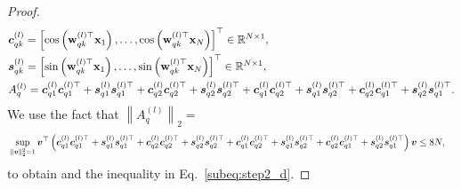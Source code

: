 \begin{proof}
\begin{equation}
    \begin{aligned}
        & \boldsymbol{c}_{qk}^{(l)}  =\left[\cos \left( {\mathbf w}_{qk}^{(l)\top} {\mathbf x}_1\right), \ldots, \cos \left({\mathbf w}_{qk}^{(l)\top} {\mathbf x}_N\right)\right]^\top \in \mathbb{R}^{N \times 1}, \\
        & \boldsymbol{s}_{qk}^{(l)}  =\left[\sin \left( {\mathbf w}_{qk}^{(l)\top} {\mathbf x}_1\right) , \ldots, \sin \left({\mathbf w}_{qk}^{(l)\top} {\mathbf x}_N\right)\right]^\top \in \mathbb{R}^{N \times 1},\\
        & A_{q}^{(l)} = \boldsymbol{c}_{q1}^{(l)}\boldsymbol{c}_{q1}^{(l)\top}
        +\boldsymbol{s}_{q1}^{(l)}\boldsymbol{s}_{q1}^{(l)\top} + \boldsymbol{c}_{q2}^{(l)}\boldsymbol{c}_{q2}^{(l)\top}
        +\boldsymbol{s}_{q2}^{(l)}\boldsymbol{s}_{q2}^{(l)\top} +\boldsymbol{c}_{q1}^{(l)}\boldsymbol{c}_{q2}^{(l)\top}
        +\boldsymbol{s}_{q1}^{(l)}\boldsymbol{s}_{q2}^{(l)\top} +\boldsymbol{c}_{q2}^{(l)}\boldsymbol{c}_{q1}^{(l)\top}
        +\boldsymbol{s}_{q2}^{(l)}\boldsymbol{s}_{q1}^{(l)\top}.   
    \end{aligned}
\end{equation}
We use the fact that $\left\|A_{q}^{(l)}\right\|_2=$
\begin{equation}
\setlength{\abovedisplayskip}{3.5pt}
\setlength{\belowdisplayskip}{3.4pt}
\begin{aligned}
& \sup _{\|\bm{v}\|_2^2=1} \bm{v}^\top\left(\bm{c}_{q1}^{(l)}\bm{c}_{q1}^{(l)\top}
        +\bm{s}_{q1}^{(l)}\bm{s}_{q1}^{(l)\top} + \bm{c}_{q2}^{(l)}\bm{c}_{q2}^{(l)\top}
        +\bm{s}_{q2}^{(l)}\bm{s}_{q2}^{(l)\top} +\bm{c}_{q1}^{(l)}\bm{c}_{q2}^{(l)\top}
        +\bm{s}_{q1}^{(l)}\bm{s}_{q2}^{(l)\top} +\bm{c}_{q2}^{(l)}\bm{c}_{q1}^{(l)\top}      +\bm{s}_{q2}^{(l)}\bm{s}_{q1}^{(l)\top}\right) \bm{v}
 \leq 8 N,
\end{aligned}
\end{equation}
to obtain and the inequality in Eq.~\eqref{subeq:step2_d}.



\end{proof}

